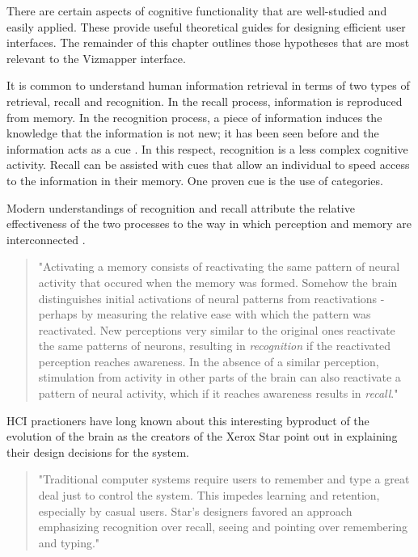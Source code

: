 There are certain aspects of cognitive functionality that are well-studied and easily applied. These provide useful theoretical guides for designing efficient user interfaces. The remainder of this chapter outlines those hypotheses that are most relevant to the Vizmapper interface.

It is common to understand human information retrieval in terms of two types of retrieval, recall and recognition. In the recall process, information is reproduced from memory. In the recognition process, a piece of information induces the knowledge that the information is not new; it has been seen before and the information acts as a cue \cite{hci1998}. In this respect, recognition is a less complex cognitive activity. Recall can be assisted with cues that allow an individual to speed access to the information in their memory. One proven cue is the use of categories.

Modern understandings of recognition and recall attribute the relative effectiveness of the two processes to the way in which perception and memory are interconnected \cite{mindinmind2010}.

\begin{quote}
"Activating a memory consists of reactivating the same pattern of neural activity that occured when the memory was formed. Somehow the brain distinguishes initial activations of neural patterns from reactivations - perhaps by measuring the relative ease with which the pattern was reactivated. New perceptions very similar to the original ones reactivate the same patterns of neurons, resulting in \emph{recognition} if the reactivated perception reaches awareness. In the absence of a similar perception, stimulation from activity in other parts of the brain can also reactivate a pattern of neural activity, which if it reaches awareness results in \emph{recall}." \cite{mindinmind2010}
\end{quote}

HCI practioners have long known about this interesting byproduct of the evolution of the brain as the creators of the Xerox Star point out in explaining their design decisions for the system.

\begin{quote}
"Traditional computer systems require users to remember and type a great deal just to control the system. This impedes learning and retention, especially by casual users. Star's designers favored an approach emphasizing recognition over recall, seeing and pointing over remembering and typing." \cite{xeroxstar1989}
\end{quote}

